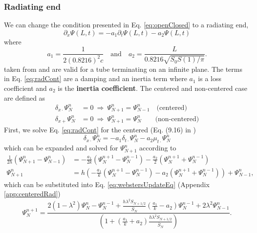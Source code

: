 \documentclass[dvipsnames]{article}
\def\dtd{\delta_{t\cdot}}
\begin{document}
\subsubsection{Radiating end}\label{sec:radiating}
We can change the condition presented in Eq. \eqref{eq:openClosed} to a radiating end,
\begin{equation}\label{eq:radCont}
    \partial_x\Psi(L,t) = -a_1\partial_t\Psi(L,t)-a_2\Psi(L,t)
\end{equation}
where \cite{Bilbao2009}
\begin{equation}
    a_1 = \frac{1}{2(0.8216)^2c} \quad \text{and} \quad a_2 = \frac{L}{0.8216\sqrt{S_0S(1)/\pi}}.
\end{equation}
taken from \cite{Atig2004} and are valid for a tube terminating on an infinite plane. The terms in Eq. \eqref{eq:radCont} are a damping and an inertia term where $a_1$ is a loss coefficient and $a_2$ is the \textbf{inertia coefficient}. The centered and non-centered case are defined as
\begin{equation}
\begin{split}
    \delta_{x\cdot}\Psi_N^n &= 0 \ \Rightarrow \ \Psi_{N+1}^n = \Psi_{N-1}^n \quad \text{(centered)}\\
    \delta_{x+}\Psi_N^n &= 0\  \Rightarrow \ \Psi_{N+1}^n = \Psi_N^n\qquad \text{(non-centered)}
\end{split}
\end{equation}
First, we solve Eq. \eqref{eq:radCont} for the centered (Eq. (9.16) in \cite{Bilbao2009})
\begin{equation}\label{eq:centRadBound}
    \delta_{x\cdot}\Psi_N^n = -a_1\dtd\Psi_N^n - a_2\mu_{t\cdot}\Psi_N^n
\end{equation}
which can be expanded and solved for $\Psi_{N+1}^n$ according to
\begin{align}
    \frac{1}{2h}(\Psi_{N+1}^n - \Psi_{N-1}^n) &= -\frac{a_1}{2k}(\Psi_N^{n+1} - \Psi_N^{n-1}) - \frac{a_2}{2}(\Psi_N^{n+1} + \Psi_N^{n-1})\nonumber\\
    \Psi_{N+1}^n &= h\left(-\frac{a_1}{k}(\Psi_N^{n+1} - \Psi_N^{n-1}) - a_2(\Psi_N^{n+1} + \Psi_N^{n-1})\right) + \Psi_{N-1}^n,
\end{align}
which can be substituted into Eq. \eqref{eq:webstersUpdateEq} (Appendix \ref{app:centeredRad}) 
\begin{equation}
    \Psi_N^{n+1} = \frac{2(1-\lambda^2)\Psi_N^n-\Psi_N^{n-1}+\frac{h\lambda^2S_{N+1/2}}{\bar S_N}\left(\frac{a_1}{k}-a_2\right)\Psi_N^{n-1} + 2\lambda^2\Psi_{N-1}^n}{\left(1+\left(\frac{a_1}{k}+a_2\right)\frac{h\lambda^2S_{N+1/2}}{\bar S_N}\right)}.
\end{equation}
\end{document}
